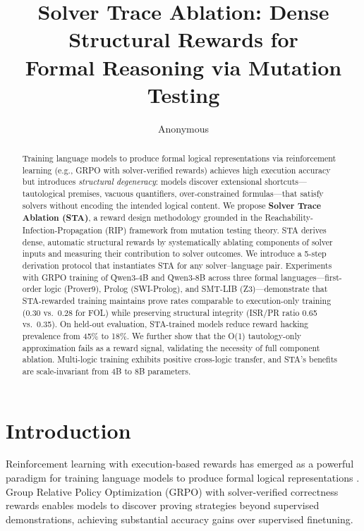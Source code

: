 \documentclass[11pt,a4paper]{article}
\title{Solver Trace Ablation: Dense Structural Rewards for\\Formal Reasoning via Mutation Testing}
\author{Anonymous}
\begin{document}
\maketitle

\begin{abstract}
Training language models to produce formal logical representations via reinforcement learning (e.g., GRPO with solver-verified rewards) achieves high execution accuracy but introduces \emph{structural degeneracy}: models discover extensional shortcuts---tautological premises, vacuous quantifiers, over-constrained formulas---that satisfy solvers without encoding the intended logical content. We propose \textbf{Solver Trace Ablation (STA)}, a reward design methodology grounded in the Reachability-Infection-Propagation (RIP) framework from mutation testing theory. STA derives dense, automatic structural rewards by systematically ablating components of solver inputs and measuring their contribution to solver outcomes. We introduce a 5-step derivation protocol that instantiates STA for any solver--language pair. Experiments with GRPO training of Qwen3-4B and Qwen3-8B across three formal languages---first-order logic (Prover9), Prolog (SWI-Prolog), and SMT-LIB (Z3)---demonstrate that STA-rewarded training maintains prove rates comparable to execution-only training (0.30 vs.\ 0.28 for FOL) while preserving structural integrity (ISR/PR ratio 0.65 vs.\ 0.35). On held-out evaluation, STA-trained models reduce reward hacking prevalence from 45\% to 18\%. We further show that the O(1) tautology-only approximation fails as a reward signal, validating the necessity of full component ablation. Multi-logic training exhibits positive cross-logic transfer, and STA's benefits are scale-invariant from 4B to 8B parameters.
\end{abstract}

\section{Introduction}
\label{sec:intro}

Reinforcement learning with execution-based rewards has emerged as a powerful paradigm for training language models to produce formal logical representations \cite{mellgren2025prolog,evom2026}. Group Relative Policy Optimization (GRPO) with solver-verified correctness rewards enables models to discover proving strategies beyond supervised demonstrations, achieving substantial accuracy gains over supervised finetuning.
\end{document}
